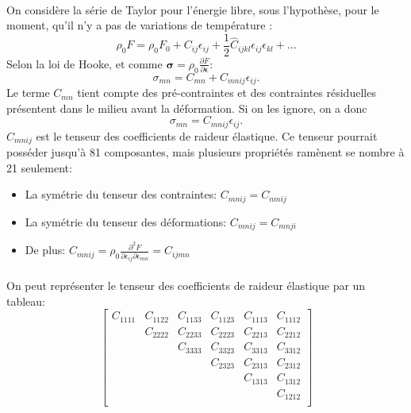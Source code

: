 \paragraph{}
On considère la série de Taylor pour l'énergie libre, sous l'hypothèse, pour le moment, qu'il n'y a pas de variations de température :
\begin{equation}\label{taylor_energie_libre}\rho_0F=\rho_0F_0+C_{ij}\epsilon_{ij}+\frac{1}{2}\hat{C}_{ijkl}\epsilon_{ij}\epsilon_{kl}+...\end{equation}
Selon la loi de Hooke, et comme $\boldsymbol{\sigma}=\rho_0\frac{\partial F}{\partial \boldsymbol{\epsilon}}$: $$\sigma_{mn}=C_{mn}+C_{mnij}\epsilon_{ij}.$$
Le terme $C_{mn}$ tient compte des pré-contraintes et des contraintes résiduelles présentent dans le milieu avant la déformation. Si on les ignore, on a donc $$\sigma_{mn}=C_{mnij}\epsilon_{ij}.$$
$C_{mnij}$ est le tenseur des coefficients de raideur élastique. Ce tenseur pourrait posséder jusqu'à 81 composantes, mais plusieurs propriétés ramènent se nombre à 21 seulement:
\begin{itemize}
\item La symétrie du tenseur des contraintes: $C_{mnij}=C_{nmij}$
\item La symétrie du tenseur des déformations: $C_{mnij}=C_{mnji}$
\item De plus: $C_{mnij}=\rho_0\frac{\partial^2F}{\partial\epsilon_{ij}\partial\epsilon_{mn}}=C_{ijmn}$
\end{itemize}
\paragraph{}
On peut représenter le tenseur des coefficients de raideur élastique par un tableau:
$$\left[
\begin{array}{cccccc}
C_{1111}&C_{1122}&C_{1133}&C_{1123}&C_{1113}&C_{1112}\\
 & C_{2222}&C_{2233}&C_{2223}&C_{2213}&C_{2212}\\
 & & C_{3333}&C_{3323}&C_{3313}&C_{3312}\\
 & & &C_{2323}&C_{2313}&C_{2312}\\
 & & & &C_{1313}&C_{1312}\\
 & & & & &C_{1212}\\
\end{array}\right]$$
